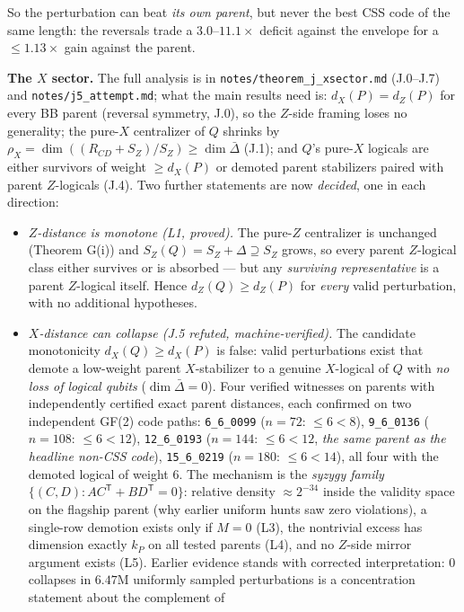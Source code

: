 \documentclass[11pt]{article}
\theoremstyle{plain}
\theoremstyle{remark}
\begin{document}
So the perturbation can beat \emph{its own parent}, but never the best CSS code of the same
length: the reversals trade a $3.0$--$11.1\times$ deficit against the envelope for a $\le 1.13\times$
gain against the parent.

\textbf{The $X$ sector.} The full analysis is in \texttt{notes/theorem\_j\_xsector.md}
(J.0--J.7) and \texttt{notes/j5\_attempt.md}; what the main results need is:
$d_X(P)=d_Z(P)$ for every BB parent (reversal symmetry, J.0), so the $Z$-side framing
loses no generality; the pure-$X$ centralizer of $Q$ shrinks by
$\rho_X=\dim((R_{CD}+S_Z)/S_Z)\ge\dim\bar\Delta$ (J.1); and $Q$'s pure-$X$
logicals are either survivors of weight $\ge d_X(P)$ or demoted parent stabilizers paired
with parent $Z$-logicals (J.4). Two further statements are now \emph{decided}, one in
each direction:
\begin{itemize}
\item \emph{$Z$-distance is monotone (L1, proved).} The pure-$Z$ centralizer is unchanged
(Theorem G(i)) and $S_Z(Q)=S_Z+\Delta\supseteq S_Z$ grows, so every parent $Z$-logical
class either survives or is absorbed --- but any \emph{surviving representative} is a
parent $Z$-logical itself. Hence $d_Z(Q)\ge d_Z(P)$ for \emph{every} valid perturbation,
with no additional hypotheses.
\item \emph{$X$-distance can collapse (J.5 refuted, machine-verified).} The candidate
monotonicity $d_X(Q)\ge d_X(P)$ is false: valid perturbations exist that demote a
low-weight parent $X$-stabilizer to a genuine $X$-logical of $Q$ with \emph{no loss of
logical qubits} ($\dim\bar\Delta=0$). Four verified witnesses on parents with
independently certified exact parent distances, each confirmed on two independent GF(2)
code paths: \texttt{6\_6\_0099} ($n{=}72$: $\le6<8$), \texttt{9\_6\_0136} ($n{=}108$:
$\le6<12$), \texttt{12\_6\_0193} ($n{=}144$: $\le6<12$, \emph{the same parent as the
headline non-CSS code}), \texttt{15\_6\_0219} ($n{=}180$: $\le6<14$), all four with the
demoted logical of weight $6$. The mechanism is the \emph{syzygy family}
$\{(C,D):AC^{\mathsf T}+BD^{\mathsf T}=0\}$: relative density $\approx2^{-34}$ inside the
validity space on the flagship parent (why earlier uniform hunts saw zero violations),
a single-row demotion exists only if $M=0$ (L3), the nontrivial excess has dimension
exactly $k_P$ on all tested parents (L4), and no $Z$-side mirror argument exists (L5).
Earlier evidence stands with corrected interpretation: $0$ collapses in $6.47$M
uniformly sampled perturbations is a concentration statement about the complement of

\end{itemize}
\end{document}
